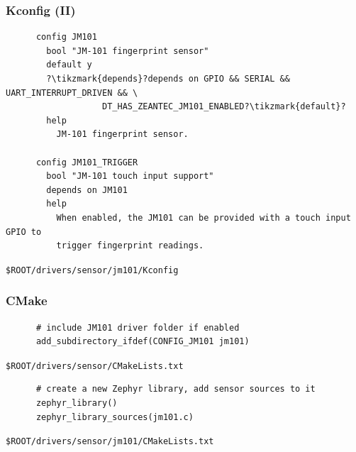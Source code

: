 \documentclass[handout]{beamer}
\begin{document}
\begin{frame}[fragile]
  \frametitle{Kconfig (II)}

  \vspace{2.5em}

  \begin{listing}[H]
    \begin{verbatim}
      config JM101
        bool "JM-101 fingerprint sensor"
        default y
        ?\tikzmark{depends}?depends on GPIO && SERIAL && UART_INTERRUPT_DRIVEN && \
                   DT_HAS_ZEANTEC_JM101_ENABLED?\tikzmark{default}?
        help
          JM-101 fingerprint sensor.

      config JM101_TRIGGER
        bool "JM-101 touch input support"
        depends on JM101
        help
          When enabled, the JM101 can be provided with a touch input GPIO to
          trigger fingerprint readings.
    \end{verbatim}
    \caption{\texttt{\$ROOT/drivers/sensor/jm101/Kconfig}}
  \end{listing}

\end{frame}

\begin{frame}[fragile]
  \frametitle{CMake}

  \begin{listing}[H]
    \begin{verbatim}
      # include JM101 driver folder if enabled
      add_subdirectory_ifdef(CONFIG_JM101 jm101)
    \end{verbatim}
    \caption{\texttt{\$ROOT/drivers/sensor/CMakeLists.txt}}
  \end{listing}

  \begin{listing}[H]
    \begin{verbatim}
      # create a new Zephyr library, add sensor sources to it
      zephyr_library()
      zephyr_library_sources(jm101.c)
    \end{verbatim}
    \caption{\texttt{\$ROOT/drivers/sensor/jm101/CMakeLists.txt}
      \footnotemark}
  \end{listing}

\end{frame}
\end{document}
